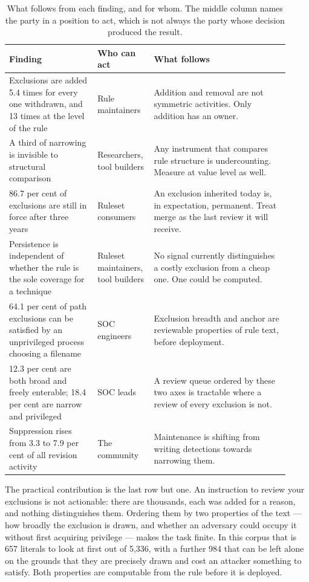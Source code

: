 \begin{table}[htbp]
\centering
\small
\caption{What follows from each finding, and for whom. The middle column names the party in a position to act, which is not always the party whose decision produced the result.}
\label{table:2}
\begin{tabular}{@{}p{0.30\linewidth}p{0.16\linewidth}p{0.46\linewidth}@{}}
\toprule
Finding & Who can act & What follows \\
\midrule
Exclusions are added 5.4 times for every one withdrawn, and 13 times at the level of the rule & Rule maintainers & Addition and removal are not symmetric activities. Only addition has an owner. \\
A third of narrowing is invisible to structural comparison & Researchers, tool builders & Any instrument that compares rule structure is undercounting. Measure at value level as well. \\
86.7 per cent of exclusions are still in force after three years & Ruleset consumers & An exclusion inherited today is, in expectation, permanent. Treat merge as the last review it will receive. \\
Persistence is independent of whether the rule is the sole coverage for a technique & Ruleset maintainers, tool builders & No signal currently distinguishes a costly exclusion from a cheap one. One could be computed. \\
64.1 per cent of path exclusions can be satisfied by an unprivileged process choosing a filename & SOC engineers & Exclusion breadth and anchor are reviewable properties of rule text, before deployment. \\
12.3 per cent are both broad and freely enterable; 18.4 per cent are narrow and privileged & SOC leads & A review queue ordered by these two axes is tractable where a review of every exclusion is not. \\
Suppression rises from 3.3 to 7.9 per cent of all revision activity & The community & Maintenance is shifting from writing detections towards narrowing them. \\
\bottomrule
\end{tabular}
\end{table}

The practical contribution is the last row but one. An instruction to review your exclusions is not actionable: there are thousands, each was added for a reason, and nothing distinguishes them. Ordering them by two properties of the text --- how broadly the exclusion is drawn, and whether an adversary could occupy it without first acquiring privilege --- makes the task finite. In this corpus that is 657 literals to look at first out of 5,336, with a further 984 that can be left alone on the grounds that they are precisely drawn and cost an attacker something to satisfy. Both properties are computable from the rule before it is deployed.

